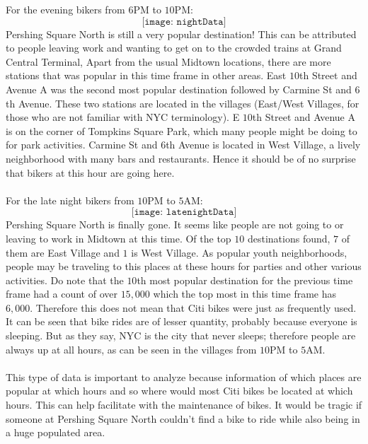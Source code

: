 \documentclass{article}
\begin{document}
For the evening bikers from $6$PM to $10$PM: 
$$ \texttt{[image: nightData]} $$
Pershing Square North is still a very popular destination! This can be attributed to people leaving work and wanting to get on to the crowded trains at Grand Central Terminal, Apart from the usual Midtown locations, there are more stations that was popular in this time frame in other areas. East $10$th Street and Avenue A was the second most popular destination followed by Carmine St and $6$th Avenue. These two stations are located in the villages (East/West Villages, for those who are not familiar with NYC terminology). E $10$th Street and Avenue A is on the corner of Tompkins Square Park, which many people might be doing to for park activities. Carmine St and $6$th Avenue is located in West Village, a lively neighborhood with many bars and restaurants. Hence it should be of no surprise that bikers at this hour are going here. \\~\\
 For the late night bikers from $10$PM to $5$AM: 
$$ \texttt{[image: latenightData]} $$ 
Pershing Square North is finally gone. It seems like people are not going to or leaving to work in Midtown at this time. Of the top $10$ destinations found, $7$ of them are East Village and $1$ is West Village. As popular youth neighborhoods, people may be traveling to this places at these hours for parties and other various activities. Do note that the $10$th most popular destination for the previous time frame had a count of over $15,000$ which the top most in this time frame has $6,000$. Therefore this does not mean that Citi bikes were just as frequently used. It can be seen that bike rides are of lesser quantity, probably because everyone is sleeping. But as they say, NYC is the city that never sleeps; therefore people are always up at all hours, as can be seen in the villages from $10$PM to $5$AM. \\~\\

This type of data is important to analyze because information of which places are popular at which hours and so where would most Citi bikes be located at which hours. This can help facilitate with the maintenance of bikes. It would be tragic if someone at Pershing Square North couldn't find a bike to ride while also being in a huge populated area. \newpage
\end{document}
